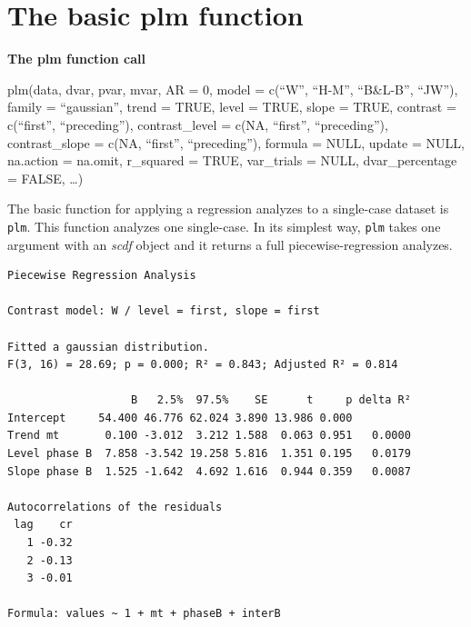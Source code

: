 \documentclass[
  letterpaper,
  DIV=11,
  numbers=noendperiod]{scrreprt}
\newenvironment{Shaded}{\begin{snugshade}}{\end{snugshade}}
\newcommand{\FunctionTok}[1]{\textcolor[rgb]{0.28,0.35,0.67}{#1}}
\newcommand{\NormalTok}[1]{\textcolor[rgb]{0.00,0.23,0.31}{#1}}
\newcommand{\SpecialCharTok}[1]{\textcolor[rgb]{0.37,0.37,0.37}{#1}}
\begin{document}
\hypertarget{the-basic-plm-function}{%
\section{The basic plm function}\label{the-basic-plm-function}}

\begin{tcolorbox}[enhanced jigsaw, breakable, rightrule=.15mm, bottomrule=.15mm, arc=.35mm, colback=white, colframe=quarto-callout-tip-color-frame, opacityback=0, leftrule=.75mm, toprule=.15mm, left=2mm]
\begin{minipage}[t]{5.5mm}
\textcolor{quarto-callout-tip-color}{\faLightbulb}
\end{minipage}%
\begin{minipage}[t]{\textwidth - 5.5mm}

\textbf{The plm function call}\vspace{2mm}

plm(data, dvar, pvar, mvar, AR = 0, model = c(``W'', ``H-M'',
``B\&L-B'', ``JW''), family = ``gaussian'', trend = TRUE, level = TRUE,
slope = TRUE, contrast = c(``first'', ``preceding''), contrast\_level =
c(NA, ``first'', ``preceding''), contrast\_slope = c(NA, ``first'',
``preceding''), formula = NULL, update = NULL, na.action = na.omit,
r\_squared = TRUE, var\_trials = NULL, dvar\_percentage = FALSE, \ldots)

\end{minipage}%
\end{tcolorbox}

The basic function for applying a regression analyzes to a single-case
dataset is \texttt{plm}. This function analyzes one single-case. In its
simplest way, \texttt{plm} takes one argument with an \emph{scdf} object
and it returns a full piecewise-regression analyzes.

\begin{Shaded}
\end{Shaded}

\begin{verbatim}
Piecewise Regression Analysis

Contrast model: W / level = first, slope = first

Fitted a gaussian distribution.
F(3, 16) = 28.69; p = 0.000; R² = 0.843; Adjusted R² = 0.814

                   B   2.5%  97.5%    SE      t     p delta R²
Intercept     54.400 46.776 62.024 3.890 13.986 0.000         
Trend mt       0.100 -3.012  3.212 1.588  0.063 0.951   0.0000
Level phase B  7.858 -3.542 19.258 5.816  1.351 0.195   0.0179
Slope phase B  1.525 -1.642  4.692 1.616  0.944 0.359   0.0087

Autocorrelations of the residuals
 lag    cr
   1 -0.32
   2 -0.13
   3 -0.01

Formula: values ~ 1 + mt + phaseB + interB
\end{verbatim}
\end{document}

